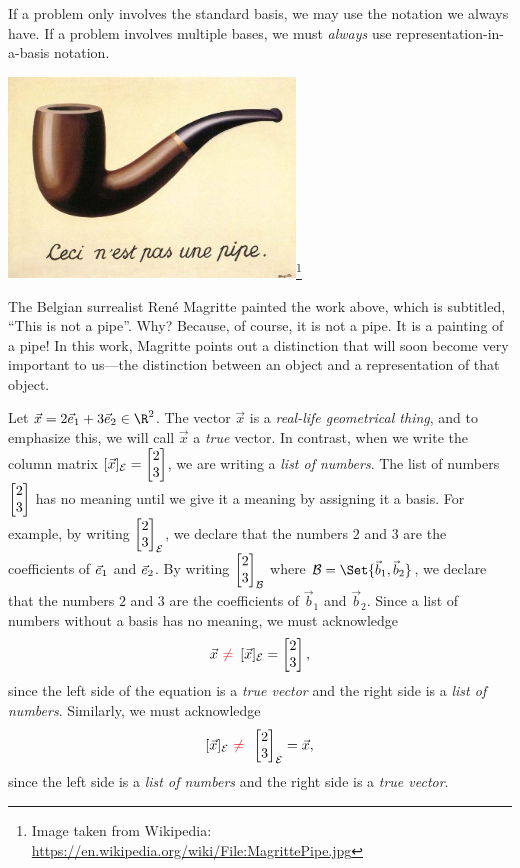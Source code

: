 \begin{emphbox}[Takeaway]
	If a problem only involves the standard basis, we may use the notation we always have. If a problem involves
	multiple bases, we must \emph{always} use representation-in-a-basis notation.
\end{emphbox}



\begin{center}
\includegraphics[width=3in]{images/MagrittePipe.jpg}\footnote{Image taken from Wikipedia: \url{https://en.wikipedia.org/wiki/File:MagrittePipe.jpg}} 
\end{center}
The Belgian surrealist Ren\'e Magritte painted the work above, which is subtitled, ``This is not a pipe''. Why? Because, of course, it is not
a pipe. It is a painting of a pipe! In this work, Magritte points out a distinction that will soon become very important to
us---the distinction between an object and a representation of that object.

\bigskip

Let $\vec x=2\xhat+3\yhat\in \R^2$. The vector $\vec x$ is a \emph{real-life geometrical thing}, and to
emphasize this, we will call $\vec x$ a \emph{true} vector. In contrast, when we write
the column matrix $[\vec x]_{\mathcal E}=\mat{2\\3}$, we are writing a \emph{list of numbers}. The list of
numbers $\mat{2\\3}$ has no meaning until we give it a meaning by assigning it a basis. For example,
by writing $\mat{2\\3}_{\mathcal E}$, we declare that the numbers $2$ and $3$ are the coefficients of ${\vec e_1}$ and
${\vec e_2}$. By writing $\mat{2\\3}_{\mathcal B}$ where $\mathcal B=\Set{\vec b_1,\vec b_2}$,
we declare that the numbers $2$ and $3$ are the coefficients of $\vec b_1$ and $\vec b_2$. Since a list of numbers
without a basis has no meaning, we must acknowledge
\[
	\vec x\,\,{\color{Red}\neq}\,\,\, [\vec x]_{\mathcal E}=\mat{2\\3},
\]
since the left side of the equation is a \emph{true vector} and the right side is a \emph{list of numbers}. Similarly,
we must acknowledge
\[
	[\vec x]_{\mathcal E}\,\,{\color{Red}\neq}\,\,\, \mat{2\\3}_{\mathcal E}=\vec x,
\]
since the left side is a \emph{list of numbers} and the right side is a \emph{true vector}.

